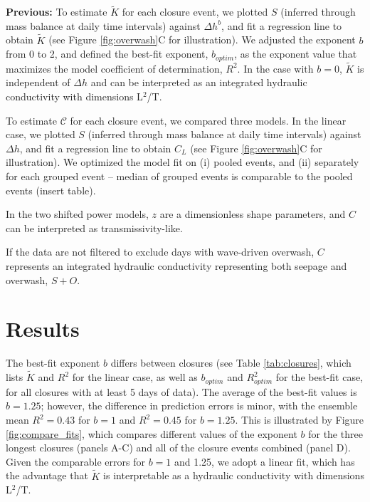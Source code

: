 \documentclass[preprint,12pt,authoryear]{elsarticle}
\begin{document}
\textbf{Previous:}
To estimate $\tilde K$ for each closure event,
 we plotted $S$ (inferred through mass balance at daily time intervals) against $\Delta h^b$, and fit a regression line to obtain $\tilde K$ (see Figure \ref{fig:overwash}C for illustration). 
We adjusted the exponent $b$ from 0 to 2, and defined the  best-fit exponent, $b_{optim}$, as the exponent value that maximizes the model coefficient of determination, $R^2$. In the  case with $b = 0$, $\tilde K$ is independent of  $\Delta h$ and can be interpreted as an integrated hydraulic conductivity with dimensions L$^2$/T. 
  

 To estimate $\mathcal{C}$ for each closure event, we compared three models.
 In the linear case, we plotted $S$ (inferred through mass balance at daily time intervals) against $\Delta h$, and fit a regression line to obtain $C_{L}$ (see Figure \ref{fig:overwash}C for illustration). 
We optimized the model fit on (i) pooled events, and (ii) separately for each grouped event – median of grouped events is comparable to the pooled events (insert table).

 
In the two shifted power models, $z$ are a dimensionless shape parameters, and $C$ can be interpreted as transmissivity-like. 


 If the data are not filtered to exclude days with wave-driven overwash, $C$ represents an integrated hydraulic conductivity representing both seepage and overwash, $S + O$.  
 


\section{Results}

The best-fit exponent $b$ differs between closures (see Table \ref{tab:closures}, which lists $\tilde K$ and $R^2$ for the linear case, as well as $b_{optim}$ and $R^2_{optim}$ for the best-fit case, for all closures with at least 5 days of data). The average of the best-fit values is $b = 1.25$; however, the difference in prediction errors is minor, with the ensemble mean $R^2=0.43$ for $b = 1$ and  $R^2=0.45$ for $b = 1.25$. This is illustrated by Figure \ref{fig:compare_fits}, which compares different values of the exponent $b$ for the three longest closures (panels A-C) and all of the closure events combined (panel D). Given the comparable errors for $b = 1$ and 1.25, we adopt a linear fit, which  has the advantage that $\tilde K$ is interpretable as a hydraulic conductivity with dimensions L$^2$/T.
\end{document}
